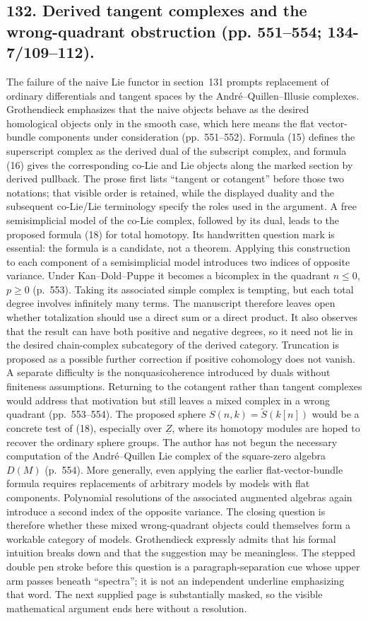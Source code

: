 \documentclass[10pt,oneside]{book}
\begin{document}
\subsection*{132. Derived tangent complexes and the wrong-quadrant obstruction (pp. 551--554; 134-7/109--112).}
The failure of the naive Lie functor in section~131 prompts replacement of ordinary differentials and tangent spaces by the Andr\'e--Quillen--Illusie complexes. Grothendieck emphasizes that the naive objects behave as the desired homological objects only in the smooth case, which here means the flat vector-bundle components under consideration (pp.~551--552). Formula (15) defines the superscript complex as the derived dual of the subscript complex, and formula (16) gives the corresponding co-Lie and Lie objects along the marked section by derived pullback. The prose first lists ``tangent or cotangent'' before those two notations; that visible order is retained, while the displayed duality and the subsequent co-Lie/Lie terminology specify the roles used in the argument. A free semisimplicial model of the co-Lie complex, followed by its dual, leads to the proposed formula (18) for total homotopy. Its handwritten question mark is essential: the formula is a candidate, not a theorem. Applying this construction to each component of a semisimplicial model introduces two indices of opposite variance. Under Kan--Dold--Puppe it becomes a bicomplex in the quadrant $n\leq0$, $p\geq0$ (p.~553). Taking its associated simple complex is tempting, but each total degree involves infinitely many terms. The manuscript therefore leaves open whether totalization should use a direct sum or a direct product. It also observes that the result can have both positive and negative degrees, so it need not lie in the desired chain-complex subcategory of the derived category. Truncation is proposed as a possible further correction if positive cohomology does not vanish. A separate difficulty is the nonquasicoherence introduced by duals without finiteness assumptions. Returning to the cotangent rather than tangent complexes would address that motivation but still leaves a mixed complex in a wrong quadrant (pp.~553--554). The proposed sphere $S(n,k)=\widetilde S(k[n])$ would be a concrete test of (18), especially over $\underline Z$, where its homotopy modules are hoped to recover the ordinary sphere groups. The author has not begun the necessary computation of the Andr\'e--Quillen Lie complex of the square-zero algebra $D(M)$ (p.~554). More generally, even applying the earlier flat-vector-bundle formula requires replacements of arbitrary models by models with flat components. Polynomial resolutions of the associated augmented algebras again introduce a second index of the opposite variance. The closing question is therefore whether these mixed wrong-quadrant objects could themselves form a workable category of models. Grothendieck expressly admits that his formal intuition breaks down and that the suggestion may be meaningless. The stepped double pen stroke before this question is a paragraph-separation cue whose upper arm passes beneath ``spectra''; it is not an independent underline emphasizing that word. The next supplied page is substantially masked, so the visible mathematical argument ends here without a resolution.
\end{document}
